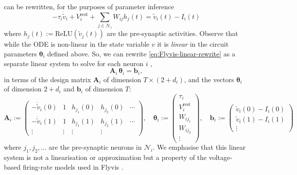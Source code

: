 \documentclass{article}
\def\vrest{V^{\mathrm{rest}}}
\def\relu{\mathrm{ReLU}}
\begin{document}
 can be rewritten, for the purposes of parameter inference
\begin{equation}
    -\tau_i \dot{\tilde{v}}_i + \vrest_i + \sum_{j \in \mathcal{N}_i} W_{ij}h_j(t) = \tilde{v}_i(t) - I_i(t)
    \label{eq:Flyvis-linear-rewrite}
\end{equation}
where $h_j(t) := \relu(\tilde{v}_j(t))$ are the pre-synaptic activities.
Observe that while the ODE is non-linear in the state variable $v$ it is
\emph{linear} {\color{revised}in the circuit parameters $\boldsymbol{\theta}_i$ defined above}. So, 
we can rewrite \cref{eq:Flyvis-linear-rewrite} as a separate
{\color{revised}linear system to solve for each neuron $i$ \citep{kristoffersen_estimating_2024},}
\begin{equation}
    \mathbf{A}_i \, \boldsymbol{\theta}_i = \mathbf{b}_i,
    \label{eq:parameter-linear-system}
\end{equation}
in terms of the design matrix $\mathbf{A}_i$ of dimension $T \times (2 + d_i)$,
and the vectors $\boldsymbol{\theta}_i$ of dimension $2 + d_i$ and
$\mathbf{b}_i$ of dimension $T$:
\begin{equation}
    \mathbf{A}_i := \begin{pmatrix}
        -\dot{\tilde{v}}_i(0) & 1 & h_{j_1}(0) & h_{j_2}(0) & \cdots  \\
        -\dot{\tilde{v}}_i(1) & 1 & h_{j_1}(1) & h_{j_2}(1) & \cdots  \\
        \vdots & \vdots & \vdots & \vdots &
    \end{pmatrix},\quad
    \boldsymbol{\theta}_i := \begin{pmatrix}
        \tau_i \\ \vrest_i \\ W_{ij_1} \\ W_{ij_2} \\ \vdots
    \end{pmatrix},\quad
    \mathbf{b}_i := \begin{pmatrix}
        \tilde{v}_i(0) - I_i(0) \\
        \tilde{v}_i(1) - I_i(1) \\
        \vdots
    \end{pmatrix}
    \label{eq:explicit-linear-system}
\end{equation}
where $j_1, j_2, \ldots$ are the pre-synaptic neurons in $\mathcal{N}_i$.
We emphasise that this linear system is not a linearisation or approximation
but a property of the voltage-based firing-rate models used in Flyvis
\citep{lappalainen_connectome-constrained_2024}.
\end{document}
